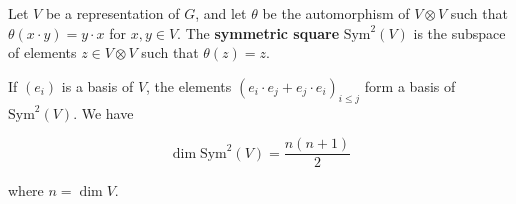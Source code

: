 Let $V$ be a representation of $G$, and let $\theta$ be the automorphism of $V \otimes V$ such that $\theta(x \cdot y) = y \cdot x$ for $x, y \in V$. The \textbf{symmetric square} $\text{Sym}^2(V)$ is the subspace of elements $z \in V \otimes V$ such that $\theta(z) = z$.

If $(e_i)$ is a basis of $V$, the elements $(e_i \cdot e_j + e_j \cdot e_i)_{i \leq j}$ form a basis of $\text{Sym}^2(V)$. We have

$$\dim \text{Sym}^2(V) = \frac{n(n+1)}{2}$$

where $n = \dim V$.
